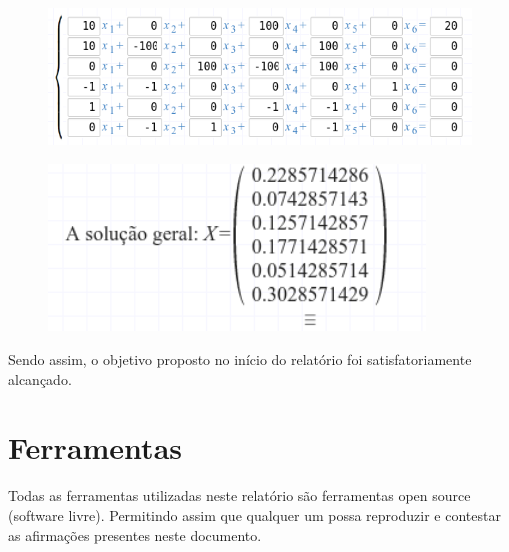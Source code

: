 \documentclass[12pt, hidelinks]{article}
\begin{document}
\newpage
\begin{figure}[!h]
  \centering
  \includegraphics[width=15cm]{figuras/r1.png}\\
\end{figure}
\begin{figure}[!h]
  \centering
  \includegraphics[width=10cm]{figuras/r2.png}\\
\end{figure}

Sendo assim, o objetivo proposto no início do relatório foi satisfatoriamente alcançado.

\newpage
\section{Ferramentas}
Todas as ferramentas utilizadas neste relatório são ferramentas open source (software livre).
Permitindo assim que qualquer um possa reproduzir e contestar as afirmações presentes neste documento.
\end{document}
